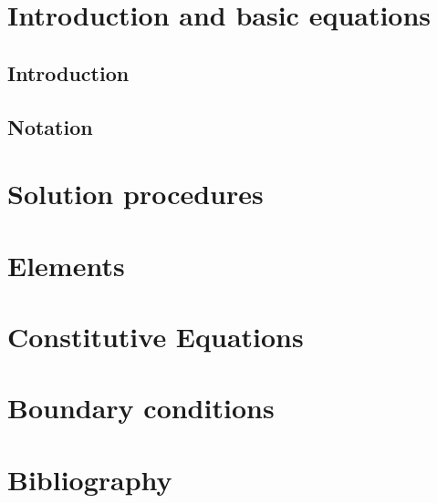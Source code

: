 \documentclass[a4paper]{book}
\begin{document}


\clearpage
\setcounter{page}{1}
\pagestyle{headings}

\tableofcontents
%
\chapter{Introduction and basic equations}
\section{Introduction}
\section{Notation}

\chapter{Solution procedures}
\chapter{Elements}
\chapter{Constitutive Equations}
\chapter{Boundary conditions}

\chapter{Bibliography}


\end{document}

